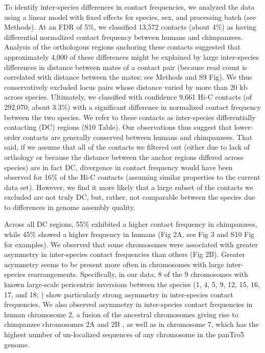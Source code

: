 To identify inter-species differences in contact frequencies, we analyzed the data using a linear model with fixed effects for species, sex, and processing batch (see Methods). At an FDR of 5\%, we classified 13,572 contacts (about 4\%) as having differential normalized contact frequency between humans and chimpanzees. Analysis of the orthologous regions anchoring these contacts suggested that approximately 4,000 of these differences might be explained by large inter-species differences in distance between mates of a contact pair (because read count is correlated with distance between the mates; see Methods and S9 Fig). We thus conservatively excluded locus pairs whose distance varied by more than 20 kb across species. Ultimately, we classified with confidence 9,661 Hi-C contacts (of 292,070; about 3.3\%) with a significant difference in normalized contact frequency between the two species. We refer to these contacts as inter-species differentially contacting (DC) regions (S10 Table). Our observations thus suggest that lower-order contacts are generally conserved between humans and chimpanzees. That said, if we assume that all of the contacts we filtered out (either due to lack of orthology or because the distance between the anchor regions differed across species) are in fact DC, divergence in contact frequency would have been observed for 16\% of the Hi-C contacts (assuming similar properties to the current data set). However, we find it more likely that a large subset of the contacts we excluded are not truly DC, but, rather, not comparable between the species due to differences in genome assembly quality.

Across all DC regions, 55\% exhibited a higher contact frequency in chimpanzees, while 45\% showed a higher frequency in humans (Fig 2A, see Fig 3 and S10 Fig for examples). We observed that some chromosomes were associated with greater asymmetry in inter-species contact frequencies than others (Fig 2B). Greater asymmetry seems to be present more often in chromosomes with large inter-species rearrangements. Specifically, in our data, 8 of the 9 chromosomes with known large-scale pericentric inversions between the species (1, 4, 5, 9, 12, 15, 16, 17, and 18; \cite{Yunis.1982, Yunis.1980, Kehrer-Sawatzki.2005, Nickerson.1998, Waterson.2005, Dennehey.2004}) show particularly strong asymmetry in inter-species contact frequencies. We also observed asymmetry in inter-species contact frequencies in human chromosome 2, a fusion of the ancestral chromosomes giving rise to chimpanzee chromosomes 2A and 2B \cite{Waterson.2005}, as well as in chromosome 7, which has the highest number of un-localized sequences of any chromosome in the panTro5 genome.


